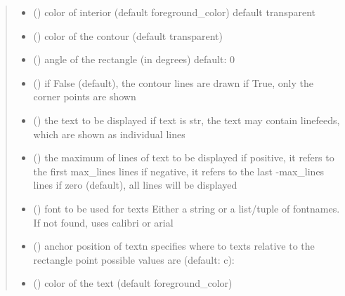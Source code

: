 \documentclass[letterpaper,10pt,english]{sphinxmanual}
\begin{document}
\begin{fulllineitems}
\begin{quote}
\begin{description}
\begin{itemize}
\item {} 
 () \textendash{} color of interior (default foreground\_color) 
default transparent

\item {} 
 () \textendash{} color of the contour (default transparent)

\item {} 
 () \textendash{} angle of the rectangle (in degrees) 
default: 0

\item {} 
 () \textendash{} if False (default), the contour lines are drawn 
if True, only the corner points are shown

\item {} 
 (\sphinxstyleliteralemphasis{, }) \textendash{} the text to be displayed 
if text is str, the text may contain linefeeds, which are shown as individual lines

\item {} 
 () \textendash{} the maximum of lines of text to be displayed 
if positive, it refers to the first max\_lines lines 
if negative, it refers to the last -max\_lines lines 
if zero (default), all lines will be displayed

\item {} 
 () \textendash{} font to be used for texts 
Either a string or a list/tuple of fontnames.
If not found, uses calibri or arial

\item {} 
 () \textendash{} anchor position of text\textbar{}n\textbar{}
specifies where to texts relative to the rectangle
point 
possible values are (default: c): 

\item {} 
 () \textendash{} color of the text (default foreground\_color)


\end{itemize}
\end{description}
\end{quote}
\end{fulllineitems}
\end{document}
